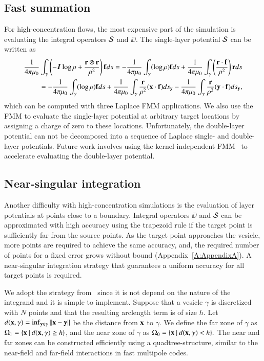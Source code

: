 \subsection{Fast summation}
For high-concentration flows, the most expensive part of the simulation
is evaluating the integral operators ${\mathcal{S}}$ and $\DD$.  The single-layer
potential ${\mathcal{S}}$ can be written as
\begin{align*}
  \frac{1}{4\pi\mu_{0}} \int_{\gamma}  \left(
    -\boldsymbol{I}\log \rho  + 
    \frac{{\mathbf{r}} \otimes {\mathbf{r}}}{\rho^{2}} \right){\mathbf{f}} ds = 
    -\frac{1}{4\pi\mu_{0}} \int_{\gamma} (\log \rho) {\mathbf{f}} ds +
    \frac{1}{4\pi\mu_{0}} \int_{\gamma}
    \left(\frac{{\mathbf{r}} \cdot {\mathbf{f}}}{\rho^{2}}\right){\mathbf{r}} ds \\
  =-\frac{1}{4\pi\mu_{0}} \int_{\gamma}(\log \rho) {\mathbf{f}} ds + 
    \frac{1}{4\pi\mu_{0}} \int_{\gamma}   
    \frac{{\mathbf{r}}}{\rho^{2}} ({\mathbf{x}} \cdot {\mathbf{f}}) ds_{{\mathbf{y}}} - 
    \frac{1}{4\pi\mu_{0}} \int_{\gamma} 
    \frac{{\mathbf{r}}}{\rho^{2}} ({\mathbf{y}} \cdot {\mathbf{f}}) ds_{{\mathbf{y}}},
\end{align*}
which can be computed with three Laplace FMM applications.  We also use
the FMM to evaluate the single-layer potential at arbitrary target
locations by assigning a charge of zero to these locations.
Unfortunately, the double-layer potential can not be decomposed into a
sequence of Laplace single- and double-layer potentials.  Future work
involves using the kernel-independent FMM~\cite{ying-biros-zorin-03} to
accelerate evaluating the double-layer potential.


\subsection{Near-singular integration}\label{s:near-singular}
Another difficulty with high-concentration simulations is the
evaluation of layer potentials at points close to a boundary.  Integral
operators $\DD$ and ${\mathcal{S}}$ can be approximated with high accuracy using
the trapezoid rule if the target point is sufficiently far from the
source points.  As the target point approaches the vesicle,
more points are required to achieve the same accuracy, and, the
required number of points for a fixed error grows without
bound (Appendix~\ref{A:AppendixA}).  A near-singular integration
strategy that guarantees a uniform accuracy for all target points is
required.  

We adopt the strategy from~\cite{ying-biros-zorin06} since it is not
depend on the nature of the integrand and it is simple to implement.
Suppose that a vesicle $\gamma$ is discretized with $N$ points and that
the resulting arclength term is of size $h$.  Let $d({\mathbf{x}},\gamma) =
\inf_{{\mathbf{y}} \in \gamma} \|{\mathbf{x}} - {\mathbf{y}}\|$ be the distance from ${\mathbf{x}}$ to
$\gamma$.  We define the far zone of $\gamma$ as $\Omega_{1}=\{{\mathbf{x}}
\:|\: d({\mathbf{x}},\gamma) \geq h\}$, and the near zone of $\gamma$ as
$\Omega_{0}=\{{\mathbf{x}} \:|\: d({\mathbf{x}},\gamma) < h\}.$ The near and far zones
can be constructed efficiently using a quadtree-structure, similar to
the near-field and far-field interactions in fast multipole codes.

